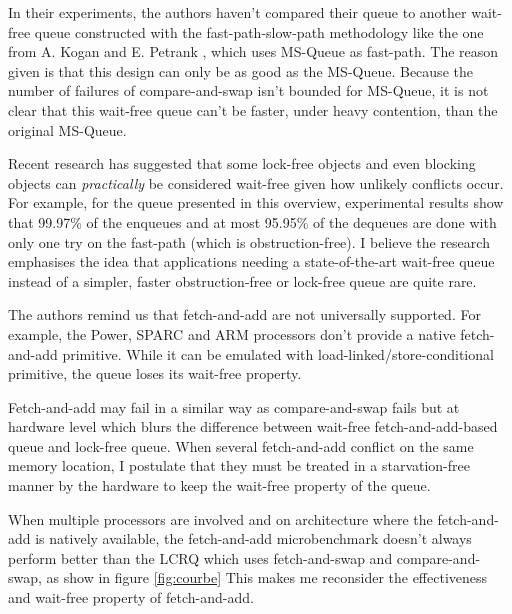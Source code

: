 In their experiments, the authors haven't compared their queue to another
wait-free queue constructed with the fast-path-slow-path methodology like the
one from A. Kogan and E. Petrank \cite{Kogan:2012:MCF:2370036.2145835}, which
uses MS-Queue as fast-path. The reason given is that this design can only be as
good as the MS-Queue. Because the number of failures of compare-and-swap isn't
bounded for MS-Queue, it is not clear that this wait-free queue can't be faster,
under heavy contention, than the original MS-Queue.

Recent research has suggested that some lock-free objects
\cite{Alistarh:2016:LCA:2997039.2903136} and even blocking objects
\cite{David:2016:CSD:2935764.2935774} can \textit{practically} be considered
wait-free given how unlikely conflicts occur. For example, for the queue
presented in this overview, experimental results show that 99.97\% of the
enqueues and at most 95.95\% of the dequeues are done with only one try on the
fast-path (which is obstruction-free). I believe the research emphasises the
idea that applications needing a state-of-the-art wait-free queue instead of a
simpler, faster obstruction-free or lock-free queue are quite rare.

The authors remind us that fetch-and-add are not universally supported. For
example, the Power, SPARC and ARM processors don't provide a native
fetch-and-add primitive. While it can be emulated with
load-linked/store-conditional primitive, the queue loses its wait-free property.

Fetch-and-add may fail in a similar way as compare-and-swap fails but at
hardware level which blurs the difference between wait-free fetch-and-add-based
queue and lock-free queue. When several fetch-and-add conflict on the same
memory location, I postulate that they must be treated in a starvation-free
manner by the hardware to keep the wait-free property of the queue.

When multiple processors are involved and on architecture where the
fetch-and-add is natively available, the fetch-and-add microbenchmark doesn't
always perform better than the LCRQ which uses fetch-and-swap and
compare-and-swap, as show in figure \ref{fig:courbe} This makes me reconsider
the effectiveness and wait-free property of fetch-and-add.
